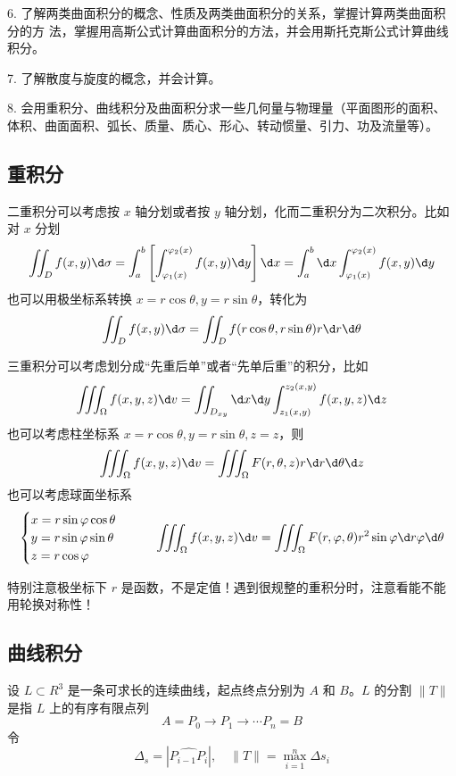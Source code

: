 6. 了解两类曲面积分的概念、性质及两类曲面积分的关系，掌握计算两类曲面积分的方
法，掌握用高斯公式计算曲面积分的方法，并会用斯托克斯公式计算曲线积分。

7. 了解散度与旋度的概念，并会计算。

8. 会用重积分、曲线积分及曲面积分求一些几何量与物理量（平面图形的面积、体积、曲面面积、弧长、质量、质心、形心、转动惯量、引力、功及流量等）。

\subsection{重积分}

二重积分可以考虑按 $x$ 轴分划或者按 $y$ 轴分划，化而二重积分为二次积分。比如对 $x$ 分划
\[ \iint_D f(x, y) \d \sigma = \int_{a}^{b} \left[ \int_{\varphi_1(x)}^{\varphi_2(x)} f(x, y) \d y \right] \d x = \int_{a}^{b} \d x \int_{\varphi_1(x)}^{\varphi_2(x)} f(x, y) \d y \]
也可以用极坐标系转换 $x = r \cos \theta, y = r \sin \theta$，转化为
\[ \iint_{D} f(x, y) \d \sigma = \iint_{D} f(r \cos \theta, r \sin \theta) r \d r \d \theta  \]

三重积分可以考虑划分成“先重后单”或者“先单后重”的积分，比如
\[ \iiint_{\Omega} f(x, y, z) \d v = \iint_{D_{xy}} \d x \d y \int_{z_1(x, y)}^{z_2(x, y)} f(x, y, z) \d z \]
也可以考虑柱坐标系 $x = r \cos \theta, y = r\sin\theta, z = z$，则
\[ \iiint_{\Omega} f(x, y, z) \d v = \iiint_{\Omega} F(r, \theta, z) r \d r \d \theta \d z \]
也可以考虑球面坐标系
\[ \begin{cases}
	x = r \sin \varphi \cos \theta\\
	y = r \sin \varphi \sin \theta\\
	z = r \cos \varphi
\end{cases} \qquad \iiint_{\Omega} f(x, y, z) \d v = \iiint_{\Omega} F(r, \varphi, \theta) r^2 \sin \varphi \d r \varphi \d \theta \]


\begin{note}
	特别注意极坐标下 $r$ 是函数，不是定值！遇到很规整的重积分时，注意看能不能用轮换对称性！
\end{note}

\subsection{曲线积分}

设 $L \subset R^3$ 是一条可求长的连续曲线，起点终点分别为 $A$ 和 $B$。$L$ 的分割 $\|T\|$ 是指 $L$ 上的有序有限点列
\[ A = P_0 \to P_1 \to \cdots P_n = B \]
令
\[ \Delta_s = \left| \widehat{P_{i-1}P_i} \right|, \quad \|T\| = \max_{i=1}^n \Delta s_i \]

